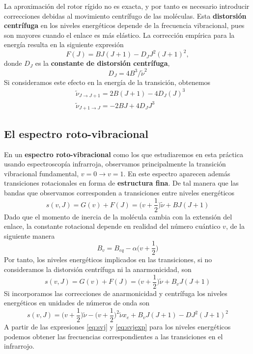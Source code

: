 \documentclass{tufte-handout}
\begin{document}
La aproximación del rotor rígido no es exacta, y por tanto es necesario
introducir correcciones debidas al movimiento centrífugo de las moléculas.
Esta \textbf{distorsión centrífuga} en los niveles energéticos depende 
de la frecuencia vibracional, pues son mayores cuando el enlace es más 
elástico. La corrección empírica para la energía resulta en la siguiente
expresión
\begin{equation}
    F(J)=BJ(J+1) - D_JJ^2(J+1)^2,
\end{equation}
donde $D_J$ es la \textbf{constante de distorsión centrífuga}, 
\begin{equation}
    D_J=4B^3/\tilde{\nu}^2\label{eq:centrif}    
\end{equation}
Si consideramos este efecto en la energía de la transición, obtenemos
\begin{align}
    &\tilde{\nu}_{J\rightarrow J+1} = 2B(J+1) - 4D_J(J)^3\\
    &\tilde{\nu}_{J+1\rightarrow J} = -2BJ + 4D_JJ^3
\end{align}

\subsection{El espectro roto-vibracional}
En un \textbf{espectro roto-vibracional} como los que estudiaremos 
en esta práctica usando espectroscopía infrarroja, observamos 
principalmente la transición vibracional fundamental, 
$v=0\rightarrow v=1$. En este espectro aparecen además 
transiciones rotacionales en forma de \textbf{estructura fina}. 
De tal manera que las bandas que observamos corresponden
a transiciones entre niveles energéticos 
\begin{equation}
    s(v, J) = G(v) + F(J) = \Big(v+\frac{1}{2}\Big)\tilde{\nu} + BJ(J+1)
\end{equation}
Dado que el momento de inercia de la molécula cambia con la extensión
del enlace, la constante rotacional depende en realidad del número
cuántico $v$, de la siguiente manera
\begin{equation}
B_v = B_{eq} - \alpha\bigg(v+\frac{1}{2}\bigg)
\end{equation}
Por tanto, los niveles energéticos implicados en las transiciones, si no 
consideramos la distorsión centrífuga ni la anarmonicidad, son
\begin{equation}
    s(v, J) = G(v) + F(J) = \Big(v+\frac{1}{2}\Big)\tilde{\nu} + B_vJ(J+1)
    \label{eq:svj}
\end{equation}
Si incorporamos las correcciones de anarmonicidad y centrífuga
los niveles energéticos en unidades de números de onda son
\begin{equation}
    s(v, J) = \Big(v+\frac{1}{2}\Big)\tilde{\nu} - \Big(v+\frac{1}{2}\Big)^2\tilde{\nu}x_e + B_vJ(J+1)-DJ^2(J+1)^2
\label{eq:svjexp}
\end{equation}
A partir de las expresiones \ref{eq:svj} y \ref{eq:svjexp} para 
los niveles energéticos podemos obtener las frecuencias correspondientes
a las transiciones en el infrarrojo. 
\end{document}
